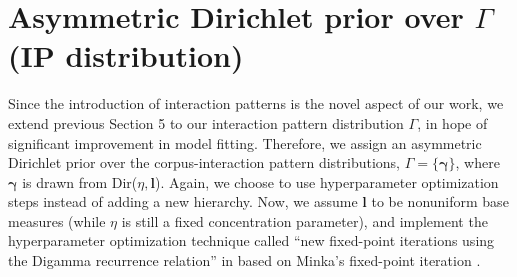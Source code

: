 \documentclass[a4paper]{article}
\begin{document}
\section{Asymmetric Dirichlet prior over $\Gamma$ (IP distribution)}
Since the introduction of interaction patterns is the novel aspect of our work, we extend previous Section 5 to our interaction pattern distribution $\Gamma$, in hope of significant improvement in model fitting. 
Therefore, we assign an asymmetric Dirichlet prior over the corpus-interaction pattern distributions, $\Gamma=\{\boldsymbol{\gamma} \}$, where $\boldsymbol{\gamma} $ is drawn from Dir($\eta, \boldsymbol{l}$). Again, we choose to use hyperparameter
optimization steps instead of adding a new hierarchy. Now, we assume $\boldsymbol{l}$ to be nonuniform base measures (while $\eta$ is still a fixed concentration parameter), and implement the hyperparameter optimization technique called ``new fixed-point iterations using the Digamma recurrence relation'' in \cite{wallach2008structured} based on Minka’s fixed-point iteration \citep{minka2000estimating}.
\end{document}
